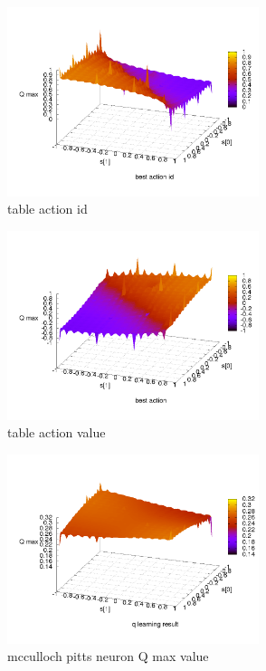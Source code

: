 \documentclass[10pt,a5paper]{article}
\begin{document}
\begin{figure}[!ht]
\centering
\includegraphics[width=2.9in]{q_learning_test/experiment_03/table/q_action_id.png}
\caption{table action id}
\label{table action id}
\end{figure}

\begin{figure}[!ht]
\centering
\includegraphics[width=2.9in]{q_learning_test/experiment_03/table/q_action.png}
\caption{table action value}
\label{table action value}
\end{figure}

\begin{figure}[!ht]
\centering
\includegraphics[width=2.9in]{q_learning_test/experiment_03/mcculloch_pitts_neuron/q_map.png}
\caption{mcculloch pitts neuron Q max value}
\label{mcculloch pitts neuron Q max value}
\end{figure}
\end{document}
